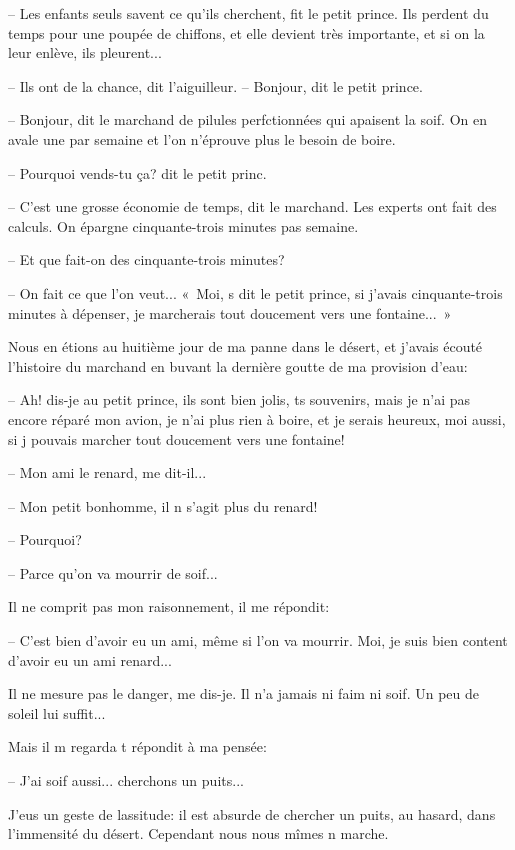 \documentclass[a4paper]{report}
\begin{document}
-- Les enfants seuls savent ce qu'ils cherchent, fit le petit prince. Ils perdent du temps pour une poupée de chiffons, et elle devient très importante, et si on la leur enlève, ils pleurent...

-- Ils ont de la chance, dit l'aiguilleur.
\parachapter{} %
-- Bonjour, dit le petit prince.

-- Bonjour, dit le marchand de pilules perfctionnées qui apaisent la soif. On en avale une par semaine et l'on n'éprouve plus le besoin de boire.

-- Pourquoi vends-tu ça? dit le petit princ.

-- C'est une grosse économie de temps, dit le marchand. Les experts ont fait des calculs. On épargne cinquante-trois minutes pas semaine.

-- Et que fait-on des cinquante-trois minutes?

-- On fait ce que l'on veut...
«~Moi, s dit le petit prince, si j'avais cinquante-trois minutes à dépenser, je marcherais tout doucement vers une fontaine...~»


\parachapter{} %
Nous en étions au huitième jour de ma panne dans le désert, et j'avais écouté l'histoire du marchand en buvant la dernière goutte de ma provision d'eau:

-- Ah! dis-je au petit prince, ils sont bien jolis, ts souvenirs, mais je n'ai pas encore réparé mon avion, je n'ai plus rien à boire, et je serais heureux, moi aussi, si j pouvais marcher tout doucement vers une fontaine!

-- Mon ami le renard, me dit-il...

-- Mon petit bonhomme, il n s'agit plus du renard!

-- Pourquoi?

-- Parce qu'on va mourrir de soif...

Il ne comprit pas mon raisonnement, il me répondit:

-- C'est bien d'avoir eu un ami, même si l'on va mourrir. Moi, je suis bien content d'avoir eu un ami renard...

Il ne mesure pas le danger, me dis-je. Il n'a jamais ni faim ni soif. Un peu de soleil lui suffit...

Mais il m regarda t répondit à ma pensée:

-- J'ai soif aussi... cherchons un puits...

J'eus un geste de lassitude: il est absurde de chercher un puits, au hasard, dans l'immensité du désert. Cependant nous nous mîmes n marche.
\end{document}
